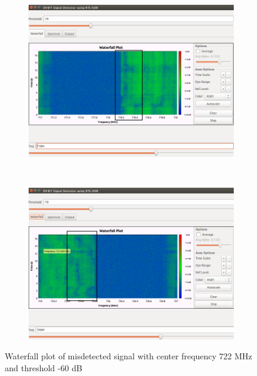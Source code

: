\begin{figure}[H]
    \centering
    \begin{subfigure}[b]{0.45\textwidth}
        \includegraphics[width=\textwidth]{figures/misdetect-1}
    \end{subfigure}
    ~ %
    \begin{subfigure}[b]{0.45\textwidth}
        \includegraphics[width=\textwidth]{figures/misdetect-2}
    \end{subfigure}
    \caption{Waterfall plot of misdetected signal with center frequency 722 MHz and threshold -60 dB}\label{fig:signal-misdetect}
\end{figure}

